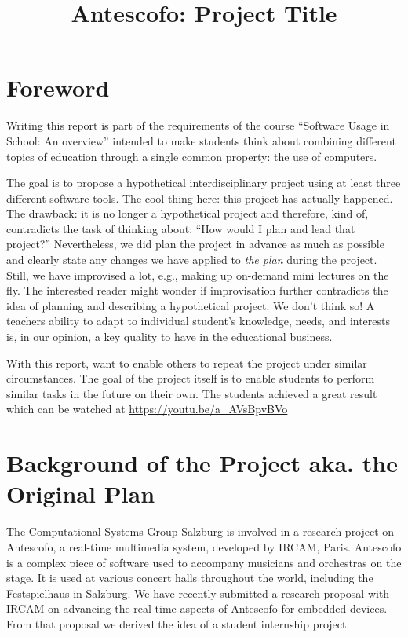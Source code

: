 \documentclass[onecolumn,nocopyrightspace,preprint]{sigplanconf}
\title{Antescofo: Project Title}
\begin{document}
\maketitle




\section{Foreword}  

Writing this report is part of the requirements of the course ``Software Usage
in School: An overview'' intended to make students think about combining
different topics of education through a single common property: the use of
computers.

The goal is to propose a hypothetical interdisciplinary project using at least
three different software tools. The cool thing here: this project has actually
happened. The drawback: it is no longer a hypothetical project and therefore,
kind of, contradicts the task of thinking about: ``How would I plan and lead
that project?'' Nevertheless, we did plan the project in advance as much as
possible and clearly state any changes we have applied  to \textit{the plan}
during the project. Still, we have improvised a lot, e.g., making up on-demand
mini lectures on the fly. The interested reader might wonder if improvisation
further contradicts the idea of planning and describing a hypothetical
project.  We don't think so! A teachers ability to adapt to individual
student's knowledge, needs, and interests is, in our opinion, a key quality to
have in the educational business.

With this report, want to enable others to repeat the project under similar
circumstances. The goal of the project itself is to enable students to perform
similar tasks in the future on their own.  The students achieved a great
result which can be watched at \url{https://youtu.be/a_AVsBpvBVo}

\section{Background of the Project aka. the Original Plan}\label{sec:background}

The Computational Systems Group Salzburg is involved in a research project on
Antescofo, a real-time multimedia system, developed by IRCAM, Paris. Antescofo
is a complex piece of software used to accompany musicians and orchestras on
the stage. It is used at various concert halls throughout the world, including
the Festspielhaus in Salzburg. We have recently submitted a research proposal
with IRCAM on advancing the real-time aspects of Antescofo for embedded
devices. From that proposal we derived the idea of a student internship
project.
\end{document}
